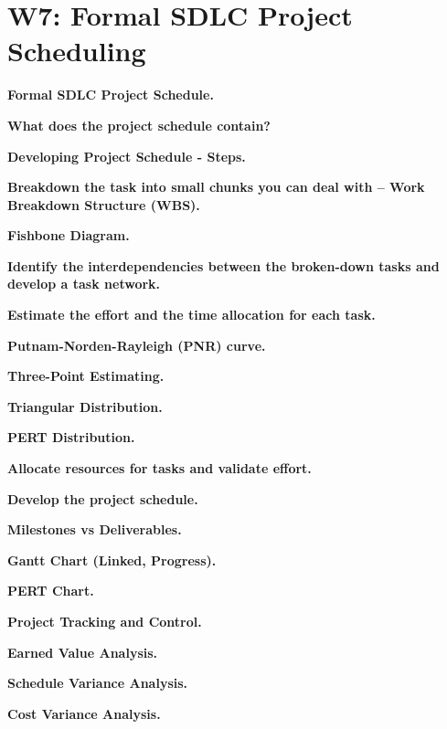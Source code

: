 \section{W7: Formal SDLC Project Scheduling}

\textbf{Formal SDLC Project Schedule.}

\textbf{What does the project schedule contain?}

\textbf{Developing Project Schedule - Steps.}

    \textbf{Breakdown the task into small chunks you can deal with – Work Breakdown Structure (WBS).}

        \textbf{Fishbone Diagram.}

    \textbf{Identify the interdependencies between the broken-down tasks and develop a task network.}

    \textbf{Estimate the effort and the time allocation for each task.}

        \textbf{Putnam-Norden-Rayleigh (PNR) curve.}

        \textbf{Three-Point Estimating.}

            \textbf{Triangular Distribution.}

            \textbf{PERT Distribution.}

    \textbf{Allocate resources for tasks and validate effort.}

    \textbf{Develop the project schedule.}





\textbf{Milestones vs Deliverables.}

\textbf{Gantt Chart (Linked, Progress).}

\textbf{PERT Chart.}



\textbf{Project Tracking and Control.}

    \textbf{Earned Value Analysis.}

    \textbf{Schedule Variance Analysis.}

    \textbf{Cost Variance Analysis.}
